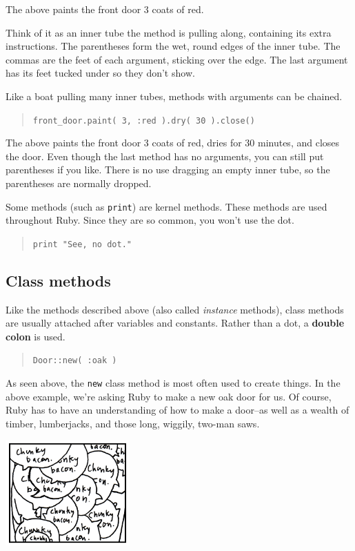 \documentclass[10pt,twoside]{report}
\begin{document}
The above paints the front door 3 coats of red.

Think of it as an inner tube the method is pulling along, containing
its extra instructions. The parentheses form the wet, round edges of
the inner tube.  The commas are the feet of each argument, sticking
over the edge.  The last argument has its feet tucked under so they
don't show.

Like a boat pulling many inner tubes, methods with arguments can be
chained.

\begin{quote}
\lstinline[breaklines=true]|front_door.paint( 3, :red ).dry( 30 ).close()|\end{quote}


The above paints the front door 3 coats of red, dries for 30 minutes,
and closes the door.  Even though the last method has no arguments,
you can still put parentheses if you like.  There is no use dragging
an empty inner tube, so the parentheses are normally dropped.

Some methods (such as \lstinline[breaklines=true]|print|) are kernel
methods.  These methods are used throughout Ruby.  Since they are so
common, you won't use the dot.

\begin{quote}
\lstinline[breaklines=true]|print "See, no dot."|\end{quote}




\subsection{Class methods}



Like the methods described above (also called {\em instance} methods),
class methods are usually attached after variables and constants.
Rather than a dot, a {\bf double colon} is used.

\begin{quote}
\lstinline[breaklines=true]|Door::new( :oak )|\end{quote}


As seen above, the \lstinline[breaklines=true]|new| class method is
most often used to create things.  In the above example, we're asking
Ruby to make a new oak door for us.  Of course, Ruby has to have an
understanding of how to make a door--as well as a wealth of timber,
lumberjacks, and those long, wiggily, two-man saws.

	\includegraphics[width=0.3575\textwidth]{cache/12.png}
\end{document}
